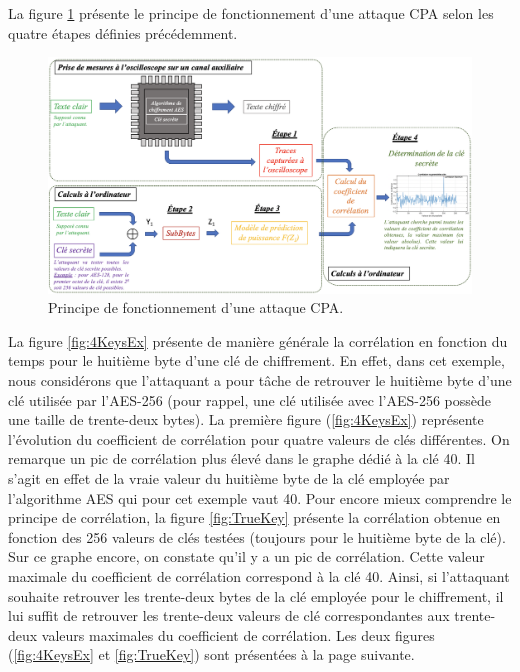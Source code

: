 \documentclass[oneside]{book}
\begin{document}
\hspace{-0.5 cm}La figure \ref{fig:CPA_attacks} présente le principe de fonctionnement d'une attaque CPA selon les quatre étapes définies précédemment. 
\begin{figure}[htbp]
    \hspace{-1.3cm}
    \includegraphics[scale=0.60]{image/CPA_attacks}
    \caption{Principe de fonctionnement d'une attaque CPA.}
    \label{fig:CPA_attacks}
\end{figure}

 \vspace{1cm}\hspace{-0.5 cm}La figure \ref{fig:4KeysEx} présente de manière générale la corrélation en fonction du temps pour le huitième byte d'une clé de chiffrement. En effet, dans cet exemple, nous considérons que l'attaquant a pour tâche de retrouver le huitième byte d'une clé utilisée par l'AES-256 (pour rappel, une clé utilisée avec l'AES-256 possède une taille de trente-deux bytes). La première figure (\ref{fig:4KeysEx}) représente l'évolution du coefficient de corrélation pour quatre valeurs de clés différentes. On remarque un pic de corrélation plus élevé dans le graphe dédié à la clé 40. Il s'agit en effet de la vraie valeur du huitième byte de la clé employée par l'algorithme AES qui pour cet exemple vaut 40. Pour encore mieux comprendre le principe de corrélation, la figure \ref{fig:TrueKey} présente la corrélation obtenue en fonction des 256 valeurs de clés testées (toujours pour le huitième byte de la clé). Sur ce graphe encore, on constate qu'il y a un pic de corrélation. Cette valeur maximale du coefficient de corrélation correspond à la clé 40. Ainsi, si l'attaquant souhaite retrouver les trente-deux bytes de la clé employée pour le chiffrement, il lui suffit de retrouver les trente-deux valeurs de clé correspondantes aux trente-deux valeurs maximales du coefficient de corrélation. Les deux figures (\ref{fig:4KeysEx} et \ref{fig:TrueKey}) sont présentées à la page suivante.
\end{document}
